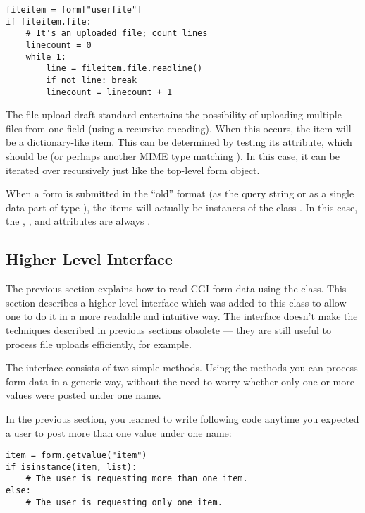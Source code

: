 \begin{verbatim}
fileitem = form["userfile"]
if fileitem.file:
    # It's an uploaded file; count lines
    linecount = 0
    while 1:
        line = fileitem.file.readline()
        if not line: break
        linecount = linecount + 1
\end{verbatim}

The file upload draft standard entertains the possibility of uploading
multiple files from one field (using a recursive
 encoding).  When this occurs, the item will be
a dictionary-like  item.  This can be determined
by testing its  attribute, which should be
 (or perhaps another MIME type matching
).  In this case, it can be iterated over
recursively just like the top-level form object.

When a form is submitted in the ``old'' format (as the query string or
as a single data part of type
), the items will actually
be instances of the class .  In this case, the
, , and  attributes are
always .


\subsection{Higher Level Interface}


The previous section explains how to read CGI form data using the
 class.  This section describes a higher level
interface which was added to this class to allow one to do it in a
more readable and intuitive way.  The interface doesn't make the
techniques described in previous sections obsolete --- they are still
useful to process file uploads efficiently, for example.

The interface consists of two simple methods. Using the methods
you can process form data in a generic way, without the need to worry
whether only one or more values were posted under one name.

In the previous section, you learned to write following code anytime
you expected a user to post more than one value under one name:

\begin{verbatim}
item = form.getvalue("item")
if isinstance(item, list):
    # The user is requesting more than one item.
else:
    # The user is requesting only one item.
\end{verbatim}

